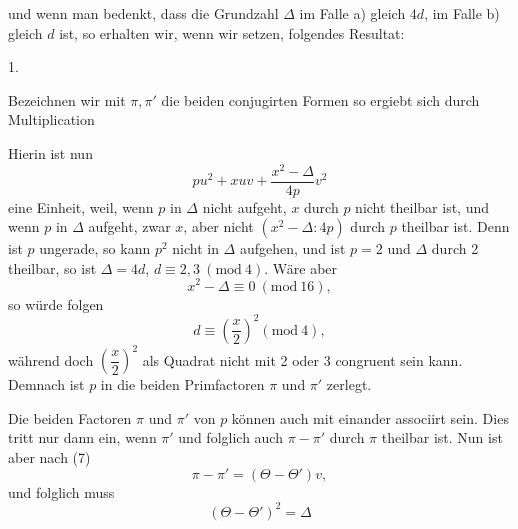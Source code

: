 und wenn man bedenkt, dass die Grundzahl $\Delta$ im Falle a) gleich $4d$, im Falle b) gleich $d$ ist, so erhalten wir, wenn wir
setzen, folgendes Resultat:

1. 

Bezeichnen wir mit $\pi, \pi'$ die beiden conjugirten Formen
so ergiebt sich durch Multiplication

Hierin ist nun
\[
pu^2 + xuv + \frac{x^2-\Delta}{4p}v^2
\]
eine Einheit, weil, wenn $p$ in $\Delta$ nicht aufgeht, $x$ durch $p$ nicht theilbar ist, und wenn $p$ in $\Delta$ aufgeht, zwar $x$, aber nicht $(x^2-\Delta:4p)$ durch $p$ theilbar ist. Denn ist $p$ ungerade, so kann $p^2$ nicht in $\Delta$ aufgehen, und ist $p=2$ und $\Delta$ durch 2 theilbar, so ist $\Delta = 4d$, $d \equiv 2, 3\ (\mathrm{mod}\ 4)$. W\"are aber
\[
x^2 - \Delta \equiv 0\ (\mathrm{mod}\ 16),
\]
so w\"urde folgen
\[
d \equiv \left(\frac{x}{2}\right)^2 (\mathrm{mod}\ 4),
\]
w\"ahrend doch $\left(\dfrac{x}{2}\right)^2$ als Quadrat nicht mit 2 oder 3 congruent sein kann. Demnach ist $p$ in die beiden Primfactoren $\pi$ und $\pi'$ zerlegt.

Die beiden Factoren $\pi$ und $\pi'$ von $p$ k\"onnen auch mit einander associirt sein. Dies tritt nur dann ein, wenn $\pi'$ und folglich auch $\pi - \pi'$ durch $\pi$ theilbar ist. Nun ist aber nach (7)
\[
\pi - \pi' = (\Theta - \Theta')v,
\]
und folglich muss
\[
(\Theta - \Theta')^2 = \Delta
\]
